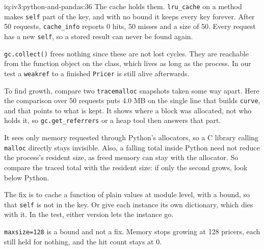 \begin{solution}{iq:iv3:python-and-pandas:36}
The cache holds them. \texttt{lru\_cache} on a method makes \texttt{self} part of the key, and with no bound it keeps every key forever. After 50 requests, \texttt{cache\_info} reports 0 hits, 50 misses and a size of 50. Every request has a new \texttt{self}, so a stored result can never be found again.

\texttt{gc.collect()} frees nothing since these are not lost cycles. They are reachable from the function object on the class, which lives as long as the process. In our test a \texttt{weakref} to a finished \texttt{Pricer} is still alive afterwards.

To find growth, compare two \texttt{tracemalloc} snapshots taken some way apart. Here the comparison over 50 requests puts 4.0 MB on the single line that builds \texttt{curve}, and that points to what is kept. It shows where a block was allocated, not who holds it, so \texttt{gc.get\_referrers} or a heap tool then answers that part.

It sees only memory requested through Python's allocators, so a C library calling \texttt{malloc} directly stays invisible. Also, a falling total inside Python need not reduce the process's resident size, as freed memory can stay with the allocator. So compare the traced total with the resident size: if only the second grows, look below Python.

The fix is to cache a function of plain values at module level, with a bound, so that \texttt{self} is not in the key. Or give each instance its own dictionary, which dies with it. In the test, either version lets the instance go.

\texttt{maxsize=128} is a bound and not a fix. Memory stops growing at 128 pricers, each still held for nothing, and the hit count stays at 0.

\end{solution}

